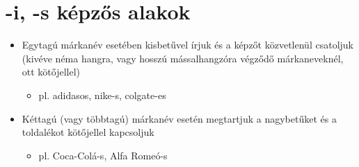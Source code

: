 \documentclass{article}
\begin{document}
\section{-i, -s képzős alakok}
\begin{itemize}
    \item Egytagú márkanév esetében kisbetűvel írjuk és a képzőt közvetlenül csatoljuk (kivéve néma hangra, vagy hosszú mássalhangzóra végződő márkaneveknél, ott kötőjellel) \begin{itemize}
        \item pl. adidasos, nike-s, colgate-es
    \end{itemize}
    \item Kéttagú (vagy többtagú) márkanév esetén megtartjuk a nagybetűket és a toldalékot kötőjellel kapcsoljuk 
    \begin{itemize}
        \item pl. Coca-Colá-s, Alfa Romeó-s
    \end{itemize}
\end{itemize}
\end{document}
